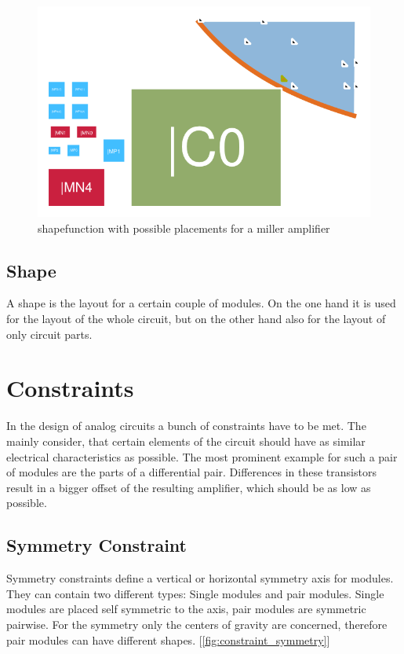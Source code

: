 \begin{figure}
	\centering
	\includegraphics[scale=1.8]{FIG/shapefunction.png}
	\caption{shapefunction with possible placements for a miller amplifier}
	\label{fig:shapefunction}
\end{figure}

\subsection{Shape}
A shape is the layout for a certain couple of modules. On the one hand it is used for the layout of the whole circuit, but on the other hand also for the layout of only circuit parts.

\section{Constraints}
In the design of analog circuits a bunch of constraints have to be met. The mainly consider, that certain elements of the circuit should have as similar electrical characteristics as possible. The most prominent example for such a pair of modules are the parts of a differential pair. Differences in these transistors result in a bigger offset of the resulting amplifier, which should be as low as possible.

\subsection{Symmetry Constraint}
Symmetry constraints define a vertical or horizontal symmetry axis for modules. They can contain two different types: Single modules and pair modules. Single modules are placed self symmetric to the axis, pair modules are symmetric pairwise. For the symmetry only the centers of gravity are concerned, therefore pair modules can have different shapes. [\ref{fig:constraint_symmetry}]

